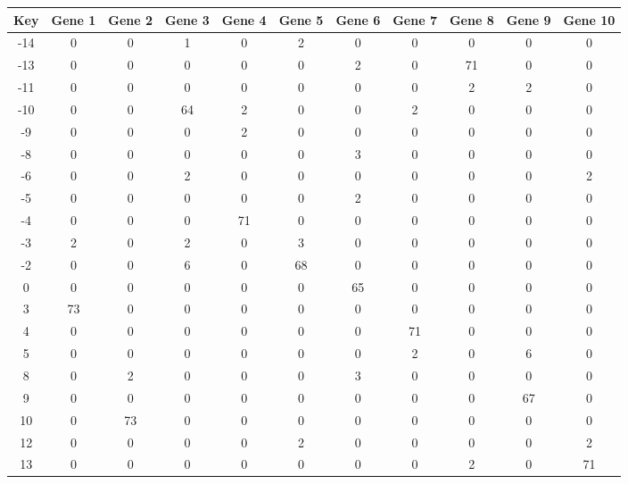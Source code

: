 \begin{tabular}{|c|c|c|c|c|c|c|c|c|c|c|}
\hline
Key & Gene 1 & Gene 2 & Gene 3 & Gene 4 & Gene 5 & Gene 6 & Gene 7 & Gene 8 & Gene 9 & Gene 10 \\
\hline
-14 & 0 & 0 & 1 & 0 & 2 & 0 & 0 & 0 & 0 & 0 \\
-13 & 0 & 0 & 0 & 0 & 0 & 2 & 0 & 71 & 0 & 0 \\
-11 & 0 & 0 & 0 & 0 & 0 & 0 & 0 & 2 & 2 & 0 \\
-10 & 0 & 0 & 64 & 2 & 0 & 0 & 2 & 0 & 0 & 0 \\
-9 & 0 & 0 & 0 & 2 & 0 & 0 & 0 & 0 & 0 & 0 \\
-8 & 0 & 0 & 0 & 0 & 0 & 3 & 0 & 0 & 0 & 0 \\
-6 & 0 & 0 & 2 & 0 & 0 & 0 & 0 & 0 & 0 & 2 \\
-5 & 0 & 0 & 0 & 0 & 0 & 2 & 0 & 0 & 0 & 0 \\
-4 & 0 & 0 & 0 & 71 & 0 & 0 & 0 & 0 & 0 & 0 \\
-3 & 2 & 0 & 2 & 0 & 3 & 0 & 0 & 0 & 0 & 0 \\
-2 & 0 & 0 & 6 & 0 & 68 & 0 & 0 & 0 & 0 & 0 \\
0 & 0 & 0 & 0 & 0 & 0 & 65 & 0 & 0 & 0 & 0 \\
3 & 73 & 0 & 0 & 0 & 0 & 0 & 0 & 0 & 0 & 0 \\
4 & 0 & 0 & 0 & 0 & 0 & 0 & 71 & 0 & 0 & 0 \\
5 & 0 & 0 & 0 & 0 & 0 & 0 & 2 & 0 & 6 & 0 \\
8 & 0 & 2 & 0 & 0 & 0 & 3 & 0 & 0 & 0 & 0 \\
9 & 0 & 0 & 0 & 0 & 0 & 0 & 0 & 0 & 67 & 0 \\
10 & 0 & 73 & 0 & 0 & 0 & 0 & 0 & 0 & 0 & 0 \\
12 & 0 & 0 & 0 & 0 & 2 & 0 & 0 & 0 & 0 & 2 \\
13 & 0 & 0 & 0 & 0 & 0 & 0 & 0 & 2 & 0 & 71 \\
\hline
\end{tabular}